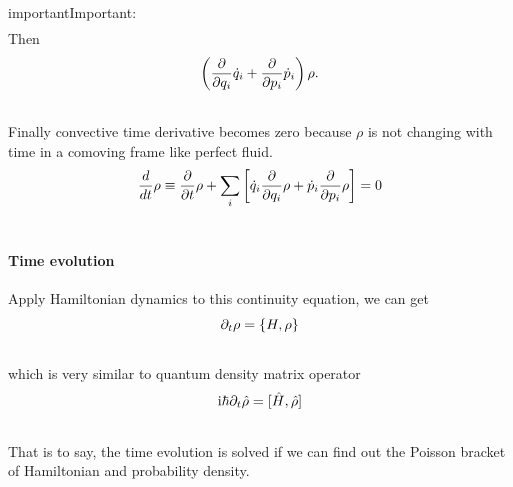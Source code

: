 \documentclass[letterpaper,10pt,english]{sphinxmanual}
\begin{document}
\begin{notice}{important}{Important:}
\begin{gather}
\end{gather}
Then
\begin{gather}
\begin{split}\left( \frac{\partial}{\partial q_i} \dot q_i + \frac{\partial}{\partial p_i} \dot p_i\right) \rho  .\end{split}\notag\\\begin{split}\end{split}\notag
\end{gather}
Finally convective time derivative becomes zero because $\rho$ is not changing with time in a comoving frame like perfect fluid.
\begin{gather}
\begin{split}\frac{d}{d t} \rho \equiv  \frac{\partial}{\partial t}\rho + \sum_i \left[ \dot q_i \frac{\partial}{\partial q_i} \rho  + \dot p_i \frac{\partial}{\partial p_i} \rho \right] =0\end{split}\notag\\\begin{split}\end{split}\notag
\end{gather}\end{notice}


\paragraph{Time evolution}
\label{equilibrium/week4:time-evolution}
Apply Hamiltonian dynamics to this continuity equation, we can get
\begin{gather}
\begin{split}\partial_t \rho = \{H, \rho\}\end{split}\notag\\\begin{split}\end{split}\notag
\end{gather}
which is very similar to quantum density matrix operator
\begin{gather}
\begin{split}\mathrm i \hbar \partial_t \hat \rho = [ \hat H, \hat \rho ]\end{split}\notag\\\begin{split}\end{split}\notag
\end{gather}
That is to say, the time evolution is solved if we can find out the Poisson bracket of Hamiltonian and probability density.
\end{document}
